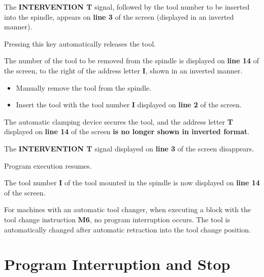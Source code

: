 The \textbf{INTERVENTION T} signal, followed by the tool number to be inserted into the spindle, appears on \textbf{line 3} of the screen (displayed in an inverted manner).

\begin{itemize}
\end{itemize}

Pressing this key automatically releases the tool.

The number of the tool to be removed from the spindle is displayed on \textbf{line 14} of the screen,  
to the right of the address letter \textbf{I}, shown in an inverted manner.

\begin{itemize}
    \item Manually remove the tool from the spindle.
    \item Insert the tool with the tool number \textbf{I} displayed on \textbf{line 2} of the screen.
\end{itemize}

\begin{itemize}
\end{itemize}

The automatic clamping device secures the tool,  
and the address letter \textbf{T} displayed on \textbf{line 14} of the screen \textbf{is no longer shown in inverted format}.

\begin{itemize}
\end{itemize}

The \textbf{INTERVENTION T} signal displayed on \textbf{line 3} of the screen disappears.

Program execution resumes.

The tool number \textbf{I} of the tool mounted in the spindle is now displayed on \textbf{line 14} of the screen.

\notes

For machines with an automatic tool changer, when executing a block with the tool change instruction \textbf{M6},  
no program interruption occurs. The tool is automatically changed after automatic retraction into the tool change position.

\newpage

\section{Program Interruption and Stop}

